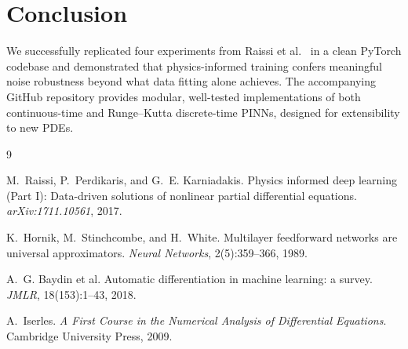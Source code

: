 \documentclass[10pt,twocolumn]{article}
\begin{document}
\section{Conclusion}

We successfully replicated four experiments from Raissi et al.~\cite{raissi2017}
in a clean PyTorch codebase and demonstrated that physics-informed
training confers meaningful noise robustness beyond what data fitting
alone achieves.  The accompanying GitHub repository provides modular,
well-tested implementations of both continuous-time and
Runge--Kutta discrete-time PINNs, designed for extensibility to new PDEs.


\begin{thebibliography}{9}

M.~Raissi, P.~Perdikaris, and G.~E. Karniadakis.
\newblock Physics informed deep learning ({Part I}): Data-driven solutions of
  nonlinear partial differential equations.
\newblock \emph{arXiv:1711.10561}, 2017.

K.~Hornik, M.~Stinchcombe, and H.~White.
\newblock Multilayer feedforward networks are universal approximators.
\newblock \emph{Neural Networks}, 2(5):359--366, 1989.

A.~G. Baydin et al.
\newblock Automatic differentiation in machine learning: a survey.
\newblock \emph{JMLR}, 18(153):1--43, 2018.

A.~Iserles.
\newblock \emph{A First Course in the Numerical Analysis of Differential
  Equations}.
\newblock Cambridge University Press, 2009.

\end{thebibliography}
\end{document}
